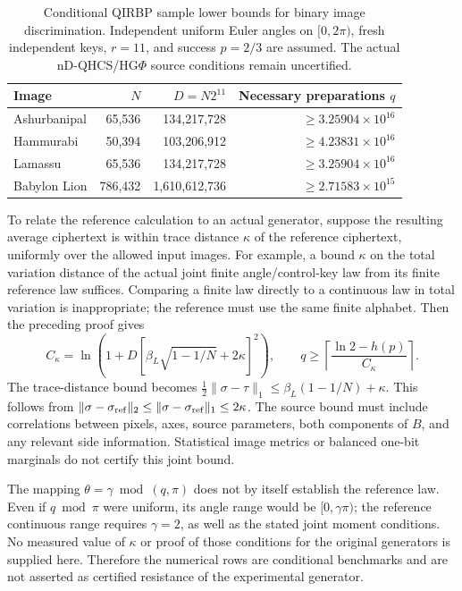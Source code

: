 {\begin{table}[htbp]
\centering
\color{red}
\caption{{\color{red}Conditional QIRBP sample lower bounds for binary image
discrimination. Independent uniform Euler angles on $[0,2\pi)$,
fresh independent keys, $r=11$, and success $p=2/3$ are assumed.
The actual nD-QHCS/HG$\Phi$ source conditions remain uncertified.}}
\label{tab:qef_quantum_attack_resistance}
\small
\begin{tabular}{lrrr}
\toprule
Image & $N$ & $D=N2^{11}$ & Necessary preparations $q$\\
\midrule
Ashurbanipal & 65,536 & 134,217,728 & $\geq3.25904\times10^{16}$\\
Hammurabi & 50,394 & 103,206,912 & $\geq4.23831\times10^{16}$\\
Lamassu & 65,536 & 134,217,728 & $\geq3.25904\times10^{16}$\\
Babylon Lion & 786,432 & 1,610,612,736 & $\geq2.71583\times10^{15}$\\
\bottomrule
\end{tabular}
\end{table}

To relate the reference calculation to an actual generator, suppose
the resulting average ciphertext is within trace distance $\kappa$
of the reference ciphertext, uniformly over the allowed input images.
For example, a bound $\kappa$ on the total variation distance of the
actual joint finite angle/control-key law from its finite reference
law suffices. Comparing a finite law directly to a continuous law in
total variation is inappropriate; the reference must use the same
finite alphabet. Then the preceding proof gives
\begin{equation}
\label{eq:qef_source_robust_bound}
 C_{\kappa}=\ln\!\left(1+D
   [\beta_L\sqrt{1-1/N}+2\kappa]^2\right),\qquad
 q\geq\left\lceil\frac{\ln2-h(p)}{C_\kappa}\right\rceil.
\end{equation}
The trace-distance bound becomes
$\frac12\|\sigma-\tau\|_1\leq\beta_L(1-1/N)+\kappa$.
This follows from $\|\sigma-\sigma_{\rm ref}\|_2
\leq\|\sigma-\sigma_{\rm ref}\|_1\leq2\kappa$.
The source bound must include correlations between pixels, axes,
source parameters, both components of $B$, and any relevant side
information. Statistical image metrics or balanced one-bit marginals
do not certify this joint bound.

The mapping $\theta=\gamma\bmod(q,\pi)$ does not by itself establish
the reference law. Even if $q\bmod\pi$ were uniform, its angle range
would be $[0,\gamma\pi)$; the reference continuous range requires
$\gamma=2$, as well as the stated joint moment conditions. No measured
value of $\kappa$ or proof of those conditions for the original
generators is supplied here. Therefore the numerical rows are
conditional benchmarks and are not asserted as certified resistance
of the experimental generator.

}
